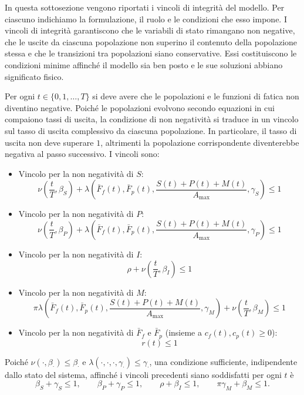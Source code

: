 In questa sottosezione vengono riportati i vincoli di integrità del modello. Per ciascuno indichiamo la formulazione, il ruolo e le condizioni che esso impone. I vincoli di integrità garantiscono che le variabili di stato rimangano non negative, che le uscite da ciascuna popolazione non superino il contenuto della popolazione stessa e che le transizioni tra popolazioni siano conservative. Essi costituiscono le condizioni minime affinché il modello sia ben posto e le sue soluzioni abbiano significato fisico. \par

Per ogni $t \in \{0, 1, \dots, T\}$ si deve avere che le popolazioni e le funzioni di fatica non diventino negative. Poiché le popolazioni evolvono secondo equazioni in cui compaiono tassi di uscita, la condizione di non negatività si traduce in un vincolo sul tasso di uscita complessivo da ciascuna popolazione. In particolare, il tasso di uscita non deve superare $1$, altrimenti la popolazione corrispondente diventerebbe negativa al passo successivo. I vincoli sono:
\begin{itemize}
    \item Vincolo per la non negatività di $S$:
        \[
            \nu\left(\frac{t}{T}, \beta_S\right) + \lambda\left(\bar{F}_f(t), \bar{F}_p(t), \frac{S(t) + P(t) + M(t)}{A_{\max}}, \gamma_S\right) \leq 1
        \]
    \item Vincolo per la non negatività di $P$:
        \[
            \nu\left(\frac{t}{T}, \beta_P\right) + \lambda\left(\bar{F}_f(t), \bar{F}_p(t), \frac{S(t) + P(t) + M(t)}{A_{\max}}, \gamma_P\right) \leq 1
        \]
    \item Vincolo per la non negatività di $I$:
        \[
            \rho + \nu\left(\frac{t}{T}, \beta_I\right) \leq 1
        \]
    \item Vincolo per la non negatività di $M$:
        \[
            \pi \lambda\left(\bar{F}_f(t), \bar{F}_p(t), \frac{S(t) + P(t) + M(t)}{A_{\max}}, \gamma_M\right) + \nu\left(\frac{t}{T}, \beta_M\right) \leq 1
        \]
    \item Vincolo per la non negatività di $\bar{F}_f$ e $\bar{F}_p$ (insieme a $c_f(t), c_p(t) \geq 0$):
        \[
            r(t) \leq 1
        \]
\end{itemize}
Poiché $\nu\left(\cdot, \beta_\cdot\right) \leq \beta_\cdot$ e $\lambda\left(\cdot, \cdot, \cdot, \gamma_\cdot\right) \leq \gamma_\cdot$, una condizione sufficiente, indipendente dallo stato del sistema, affinché i vincoli precedenti siano soddisfatti per ogni $t$ è
\[
    \beta_S + \gamma_S \leq 1, \qquad
    \beta_P + \gamma_P \leq 1, \qquad
    \rho + \beta_I \leq 1, \qquad
    \pi \gamma_M + \beta_M \leq 1.
\]

